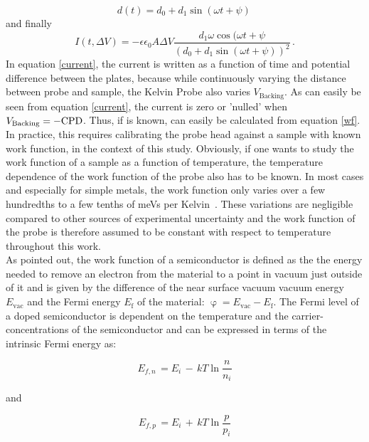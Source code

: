 \begin{equation}
	d(t) = d_0 + d_1 \sin (\omega t + \psi)\, 
\end{equation}
and finally
\begin{equation}
\label{current}
	I(t,\Delta V) = -\epsilon \epsilon _0 A \Delta V \frac{d_1 \omega \cos (\omega t + \psi}{(d_0 + d_1 \sin (\omega t + \psi))^2}\, .
\end{equation}
In equation \eqref{current}, the current is written as a function of time and potential difference between the plates, because while continuously varying the distance between probe and sample, the Kelvin Probe also varies $V_{\text{Backing}}$. As can easily be seen from equation \eqref{current}, the current is zero or 'nulled' when $V_{\text{Backing}}=-\text{CPD}$. Thus, if \wfp{} is known, \wfs{} can easily be calculated from equation \eqref{wf}. In practice, this requires calibrating the probe head against a sample with known work function, \hopg{} in the context of this study. Obviously, if one wants to study the work function of a sample as a function of temperature, the temperature dependence of the work function of the probe also has to be known. In most cases and especially for simple metals, the work function only varies over a few hundredths to a few tenths of meVs per Kelvin~\cite{tempdepmet,tempdepmet2,tempdepmet3,tempdepmet4,tempdepmet5}. These variations are negligible compared to other sources of experimental uncertainty and the work function of the probe is therefore assumed to be constant with respect to temperature throughout this work.\\
As pointed out, the work function \wf{} of a semiconductor is defined as the the energy needed to remove an electron from the material to a point in vacuum just outside of it and is given by the difference of the near surface vacuum vacuum energy $E_{\text{vac}}$ and the Fermi energy $E_{\text{f}}$ of the material: $\upvarphi = E_{\text{vac}} - E_{\text{f}}$. The Fermi level of a doped semiconductor is dependent on the temperature and the carrier-concentrations of the semiconductor and can be expressed in terms of the intrinsic Fermi energy as:\\[5pt]
\begin{minipage}[c]{0.4\textwidth}
	\begin{equation}
	\label{efn}
	E_{f,n} \, =  E_i \, - \, kT \ln{\frac{n}{n_i}}
	\end{equation}
\end{minipage}	
\hfill
and
\hfill
\begin{minipage}[c]{0.4\textwidth}
	\begin{equation}
	\label{efp}
	E_{f,p} \, = E_i \, + \, kT \ln{\frac{p}{p_i}}
	\end{equation}
\end{minipage}\\[5pt]
